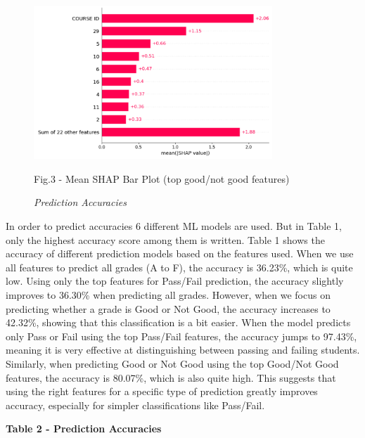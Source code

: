 \begin{figure}[H]
	\centering
	\includegraphics[width=0.8\textwidth]{media/ict/image19}
	\caption*{Fig.3 - Mean SHAP Bar Plot (top good/not good features)}
	\caption*{\emph{Prediction Accuracies}}
\end{figure}

\begin{multicols}{2}
In order to predict accuracies 6 different ML models are used. But in
Table 1, only the highest accuracy score among them is written. Table 1
shows the accuracy of different prediction models based on the features
used. When we use all features to predict all grades (A to F), the
accuracy is 36.23\%, which is quite low. Using only the top features for
Pass/Fail prediction, the accuracy slightly improves to 36.30\% when
predicting all grades. However, when we focus on predicting whether a
grade is Good or Not Good, the accuracy increases to 42.32\%, showing
that this classification is a bit easier. When the model predicts only
Pass or Fail using the top Pass/Fail features, the accuracy jumps to
97.43\%, meaning it is very effective at distinguishing between passing
and failing students. Similarly, when predicting Good or Not Good using
the top Good/Not Good features, the accuracy is 80.07\%, which is also
quite high. This suggests that using the right features for a specific
type of prediction greatly improves accuracy, especially for simpler
classifications like Pass/Fail.
\end{multicols}

{\bfseries Table 2 - Prediction Accuracies}


